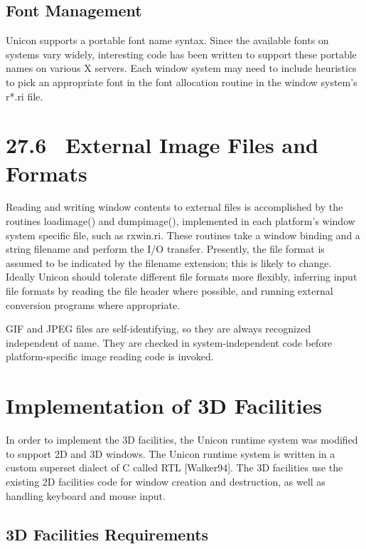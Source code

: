 \subsection{Font Management}

Unicon supports a portable font name syntax. Since the available fonts
on systems vary widely, {\textquotedbl}interesting{\textquotedbl} code
has been written to support these portable names on various X servers.
Each window system may need to include heuristics to pick an
appropriate font in the font allocation routine in the window system's
\textsf{r*.ri} file.

\section[27.6 \ External Image Files and Formats]{27.6 \ External Image Files and Formats}

Reading and writing window contents to external files is accomplished
by the routines \textsf{loadimage()} and \textsf{dumpimage()},
implemented in each platform's window system specific file, such as
\textsf{rxwin.ri}. These routines take a window binding and a string
filename and perform the I/O transfer. Presently, the file format is
assumed to be indicated by the filename extension; this is likely to
change. Ideally Unicon should tolerate different file formats more
flexibly, inferring input file formats by reading the file header
where possible, and running external conversion programs where
appropriate.

GIF and JPEG files are self-identifying, so they are always recognized
independent of name. They are checked in system-independent code
before platform-specific image reading code is invoked.


\section{Implementation of 3D Facilities}

In order to implement the 3D facilities, the Unicon runtime system was
modified to support 2D and 3D windows. The Unicon runtime system is
written in a custom superset dialect of C called RTL [Walker94]. The
3D facilities use the existing 2D facilities code for window creation
and destruction, as well as handling keyboard and mouse input.

\subsection[3D Facilities Requirements ]{\bfseries 3D Facilities Requirements }

